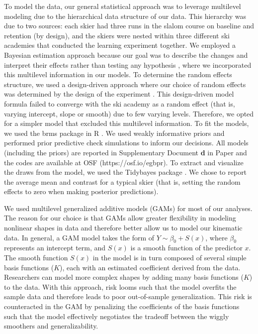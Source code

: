 To model the data, our general statistical approach was to leverage multilevel modeling due to the hierarchical data structure of our data. This hierarchy was due to two sources: each skier had three runs in the slalom course on baseline and retention (by design), and the skiers were nested within three different ski academies that conducted the learning experiment together. We employed a Bayesian estimation approach because our goal was to describe the changes and interpret their effects rather than testing any hypothesis \cite{kruschke_bayesian_2018}, where we incorporated this multilevel information in our models. To determine the random effects structure, we used a design-driven approach where our choice of random effects was determined by the design of the experiment \cite{barr_learning_2021,barr_random_2013}. This design-driven model formula failed to converge with the ski academy as a random effect (that is, varying intercept, slope or smooth) due to few varying levels. Therefore, we opted for a simpler model that excluded this multilevel information. To fit the models, we used the brms \cite{burkner_brms_2017} package in R \cite{r_core_team_r_2022}. We used weakly informative priors and performed prior predictive check simulations to inform our decisions. All models (including the priors) are reported in Supplementary Document \textbf{d} in Paper  and the codes are available at OSF  (https://osf.io/egbpr). To extract and visualize the draws from the model, we used the Tidybayes package \cite{kay_tidybayes_nodate}. We chose to report the average mean and contrast for a typical skier (that is, setting the random effects to zero when making posterior predictions).

We used multilevel generalized additive models (GAMs) \cite{pedersen_hierarchical_2019, wood_generalized_2017} for most of our analyses. The reason for our choice is that GAMs allow greater flexibility in modeling nonlinear shapes in data and therefore better allow us to model our kinematic data. In general, a GAM model takes the form of $Y \sim \beta_0 + S(x)$, where $\beta_0$ represents an intercept term, and $S(x)$ is a smooth function of the predictor $x$. The smooth function $S(x)$ in the model is in turn composed of several simple basis functions ($K$), each with an estimated coefficient derived from the data. Researchers can model more complex shapes by adding many basis functions ($K$) to the data. With this approach, risk looms such that the model overfits the sample data and therefore leads to poor out-of-sample generalization. This risk is counteracted in the GAM by penalizing the coefficients of the basis functions such that the model effectively negotiates the tradeoff between the wiggly smoothers and generalizability.


